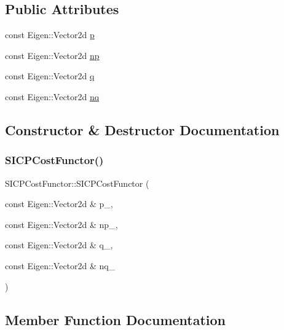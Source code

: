 \subsection*{Public Attributes}
\begin{DoxyCompactItemize}
\item 
const Eigen\+::\+Vector2d \hyperlink{structSICPCostFunctor_a79feb9473e7de7507682b8631c997fd5}{p}
\item 
const Eigen\+::\+Vector2d \hyperlink{structSICPCostFunctor_ab54300b932172659d1490eaef9d9bd24}{np}
\item 
const Eigen\+::\+Vector2d \hyperlink{structSICPCostFunctor_abf544d510d7f9f1044b8ded8a6974ca0}{q}
\item 
const Eigen\+::\+Vector2d \hyperlink{structSICPCostFunctor_a1972078dd4e688e490e9dc006411091b}{nq}
\end{DoxyCompactItemize}


\subsection{Constructor \& Destructor Documentation}
\mbox{\label{structSICPCostFunctor_a67ffe72c3bf1b99e10725184cef79604}} 
\subsubsection{\texorpdfstring{S\+I\+C\+P\+Cost\+Functor()}{SICPCostFunctor()}}
{\footnotesize\ttfamily S\+I\+C\+P\+Cost\+Functor\+::\+S\+I\+C\+P\+Cost\+Functor (\begin{DoxyParamCaption}\item[{const Eigen\+::\+Vector2d \&}]{p\+\_\+,  }\item[{const Eigen\+::\+Vector2d \&}]{np\+\_\+,  }\item[{const Eigen\+::\+Vector2d \&}]{q\+\_\+,  }\item[{const Eigen\+::\+Vector2d \&}]{nq\+\_\+ }\end{DoxyParamCaption})\hspace{0.3cm}{\ttfamily [inline]}}



\subsection{Member Function Documentation}
\mbox{\label{structSICPCostFunctor_afec70bde5ba0721191473ab89e32b8f4}} 
